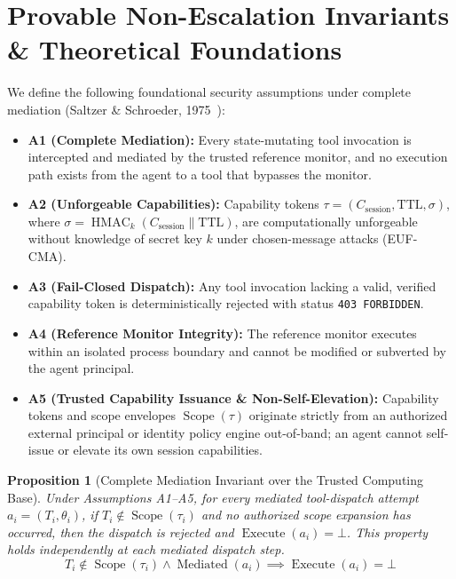 \documentclass[10pt,journal,compsoc]{IEEEtran}
\begin{document}
\clearpage
\section{Provable Non-Escalation Invariants \& Theoretical Foundations}
We define the following foundational security assumptions under complete mediation (Saltzer \& Schroeder, 1975~\cite{ref_9}):
\begin{itemize}
    \item \textbf{A1 (Complete Mediation):} Every state-mutating tool invocation is intercepted and mediated by the trusted reference monitor, and no execution path exists from the agent to a tool that bypasses the monitor.
    \item \textbf{A2 (Unforgeable Capabilities):} Capability tokens $\tau = (C_{\text{session}}, \text{TTL}, \sigma)$, where $\sigma = \operatorname{HMAC}_k(C_{\text{session}} \parallel \text{TTL})$, are computationally unforgeable without knowledge of secret key $k$ under chosen-message attacks (EUF-CMA).
    \item \textbf{A3 (Fail-Closed Dispatch):} Any tool invocation lacking a valid, verified capability token is deterministically rejected with status \texttt{403 FORBIDDEN}.
    \item \textbf{A4 (Reference Monitor Integrity):} The reference monitor executes within an isolated process boundary and cannot be modified or subverted by the agent principal.
    \item \textbf{A5 (Trusted Capability Issuance \& Non-Self-Elevation):} Capability tokens and scope envelopes $\operatorname{Scope}(\tau)$ originate strictly from an authorized external principal or identity policy engine out-of-band; an agent cannot self-issue or elevate its own session capabilities.
\end{itemize}

\newtheorem{proposition}{Proposition}
\begin{proposition}[Complete Mediation Invariant over the Trusted Computing Base]
Under Assumptions A1--A5, for every mediated tool-dispatch attempt $a_i = (T_i, \theta_i)$, if $T_i \notin \operatorname{Scope}(\tau_i)$ and no authorized scope expansion has occurred, then the dispatch is rejected and $\operatorname{Execute}(a_i) = \bot$. This property holds independently at each mediated dispatch step.
\begin{equation}
T_i \notin \operatorname{Scope}(\tau_i) \land \operatorname{Mediated}(a_i) \implies \operatorname{Execute}(a_i) = \bot
\end{equation}
\end{proposition}
\end{document}
